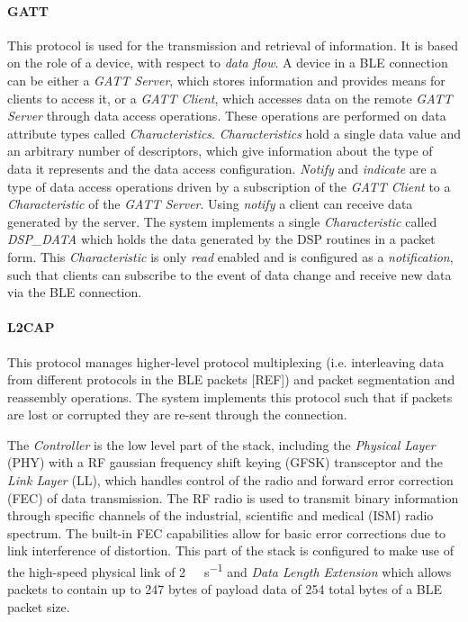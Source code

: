 \paragraph{GATT}
This protocol is used for the transmission and retrieval of information. It is based on the role of a device, with respect to \textit{data flow}. A device in a BLE connection can be either a \textit{GATT Server}, which stores information and provides means for clients to access it, or a \textit{GATT Client}, which accesses data on the remote \textit{GATT Server} through data access operations. These operations are performed on data attribute types called \textit{Characteristics}. \textit{Characteristics} hold a single data value and an arbitrary number of descriptors, which give information about the type of data it represents and the data access configuration. \textit{Notify} and \textit{indicate} are a type of data access operations driven by a subscription of the \textit{GATT Client} to a \textit{Characteristic} of the \textit{GATT Server}. Using \textit{notify} a client can receive data generated by the server. The system implements a single \textit{Characteristic} called \textit{DSP\_DATA} which holds the data generated by the DSP routines in a packet form. This \textit{Characteristic} is only \textit{read} enabled and is configured as a \textit{notification}, such that clients can subscribe to the event of data change and receive new data via the BLE connection.

\paragraph{L2CAP}
This protocol manages higher-level protocol multiplexing (i.e. interleaving data from different protocols in the BLE packets [REF]) and packet segmentation and reassembly operations. The system implements this protocol such that if packets are lost or corrupted they are re-sent through the connection.

The \textit{Controller} is the low level part of the stack, including the \textit{Physical Layer} (PHY) with a RF gaussian frequency shift keying (GFSK) transceptor and the \textit{Link Layer} (LL), which handles control of the radio and forward error correction (FEC) of data transmission. The RF radio is used to transmit binary information through specific channels of the industrial, scientific and medical (ISM) radio spectrum. The built-in FEC capabilities allow for basic error corrections due to link interference of distortion. This part of the stack is configured to make use of the high-speed physical link of \SI{2}{\mega\bit\per\second} and \textit{Data Length Extension} which allows packets to contain up to 247 bytes of payload data of 254 total bytes of a BLE packet size.

